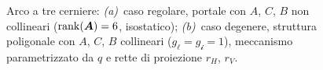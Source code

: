 \begin{figure}[!ht]
{
	}
	\caption{Arco a tre cerniere: \emph{(a)}~caso regolare,
		portale con $A$, $C$, $B$ non collineari
		($\operatorname{rank}(\bm{A})=6$, isostatico); \emph{(b)}~caso
		degenere, struttura poligonale con $A$, $C$, $B$
		collineari ($g_\ell = g_{\mathscr{i}} = 1$),
		meccanismo parametrizzato da $q$ e rette di
		proiezione $r_H$, $r_V$.}
	\label{fig:catalogo_2corpi}
\end{figure}
